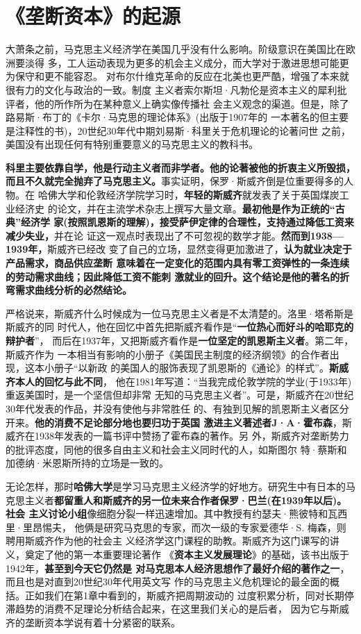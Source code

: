 \section{《垄断资本》的起源}
大萧条之前，马克思主义经济学在美国几乎没有什么影响。阶级意识在美国比在欧洲要淡得
多，工人运动表现为更多的机会主义成分，而大学对于激进思想可能更为保守和更不能容忍。
对布尔什维克革命的反应在北美也更严酷，增强了本来就很有力的文化与政治的一致。制度
主义者索尔斯坦·凡勃伦是资本主义的犀利批评者，他的所作所为在某种意义上确实像传播社
会主义观念的渠道。但是，除了路易斯·布丁的《卡尔·马克思的理论体系》(出版于1907年的
一本著名的但主要是注释性的书)，20世纪30年代中期刘易斯·科里关于危机理论的论著问世
之前，美国没有出现任何有特别重要意义的马克思主义的教科书。

\textbf{科里主要依靠自学，他是行动主义者而非学者。他的论著被他的折衷主义所毁损，
  而且不久就完全抛弃了马克思主义。}事实证明，保罗·斯威齐倒是位重要得多的人物。在
哈佛大学和伦敦经济学院学习时，\textbf{年轻的斯威齐}就发表了关于英国煤炭工业经济史
的论文，并在主流学术杂志上撰写大量文章。\textbf{最初他是作为正统的“古典”经济学
  家(按照凯恩斯的理解)，接受萨伊定律的合理性，支持通过降低工资来减少失业，}并在论
证这一观点时表现出了不可忽视的数学才能。\textbf{然而到1938—1939年，}斯威齐已经改
变了自己的立场，显然变得更加激进了，\textbf{认为就业决定于产品需求，商品供应垄断
意味着在一定变化的范围内具有零工资弹性的一条连续的劳动需求曲线；因此降低工资不能刺
激就业的回升。这个结论是他的著名的折弯需求曲线分析的必然结论。}

严格说来，斯威齐什么时候成为一位马克思主义者是不太清楚的。洛里·塔希斯是斯威齐的同
时代人，他在回忆中首先把斯威齐看作是“\textbf{一位热心而好斗的哈耶克的辩护者}”，
而后在1937年，又把斯威齐看作是\textbf{一位坚定的凯恩斯主义者}。第二年，斯威齐作为
一本相当有影响的小册子《美国民主制度的经济纲领》的合作者出现，这本小册子“以新政
的美国人的服饰表现了凯恩斯的《通论》的样式”。\textbf{斯威齐本人的回忆与此不同}，
他在1981年写道：“当我完成伦敦学院的学业(于1933年)重返美国时，是一个坚信但却非常
无知的马克思主义者”。可是，斯威齐在20世纪30年代发表的作品，并没有使他与非常胜任
的、有独到见解的凯恩斯主义者区分开来。\textbf{他的消费不足论部分地也要归功于英国
  激进主义著述者J·A·霍布森}，斯威齐在1938年发表的一篇书评中赞扬了霍布森的著作。另
外，斯威齐对垄断势力的批评态度，同他的很多自由主义和社会主义同时代的人，如斯图尔
特·蔡斯和加德纳·米恩斯所持的立场是一致的。

无论怎样，那时\textbf{哈佛大学}是学习马克思主义经济学的好地方。研究生中有日本的马
克思主义者\textbf{都留重人和斯威齐的另一位未来合作者保罗·巴兰(在1939年以后)。社会
  主义讨论小组}像细胞分裂一样迅速增加。其中教授有约瑟夫·熊彼特和瓦西里·里昂惕夫，
他俩是研究马克思的专家，而次一级的专家爱德华·S. 梅森，则聘用斯威齐作为他的社会主
义经济学这门课程的助教。斯威齐为这门课写的讲义，奠定了他的第一本重要理论著作
《\textbf{资本主义发展理论}》的基础，该书出版于1942年，\textbf{甚至到今天它仍然是
  对马克思本人经济思想作了最好介绍的著作之一}，而且也是对直到20世纪30年代用英文写
作的马克思主义危机理论的最全面的概括。正如我们在第1章中看到的，斯威齐把周期波动的
过度积累分析，同对长期停滞趋势的消费不足理论分析结合起来，在这里我们关心的是后者，
因为它与斯威齐的垄断资本学说有着十分紧密的联系。


